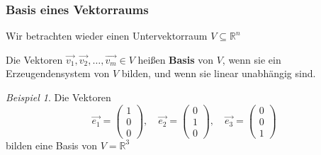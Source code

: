\documentclass[hyperref={pdfpagelabels=false}]{beamer}
\theoremstyle{plain}%
\theoremstyle{definition}
\theoremstyle{remark}
\newtheorem*{beispiel}{Beispiel}
\def \R{\mathbb R}
\newcommand{\vektor}[1]{\overrightarrow{#1}}
\begin{document}
\begin{frame}
\frametitle{Basis eines Vektorraums}
Wir betrachten wieder einen Untervektorraum $V \subseteq \R^n$

\pause
\begin{definition} Die Vektoren $\vektor{v_1}, \vektor{v_2}, \ldots, 
\vektor{v_m} \in V$ heißen \textbf{Basis} von $V$, wenn 
sie ein Erzeugendensystem von $V$ bilden, 
und wenn sie linear unabhängig sind.
\end{definition}

\pause 

\begin{beispiel} Die Vektoren  
	$$\vektor{e_1} = \left( \begin{matrix} 1 \\ 0 \\ 0 \end{matrix} \right), \quad 
	\vektor{e_2} = \left( \begin{matrix} 0 \\ 1 \\  0 \end{matrix} \right), \quad  
	\vektor{e_3} = \left( \begin{matrix} 0 \\ 0 \\ 1 \end{matrix} \right) $$ 
bilden eine Basis von $V = \mathbb R^3$
\end{beispiel}

\end{frame}
\end{document}
